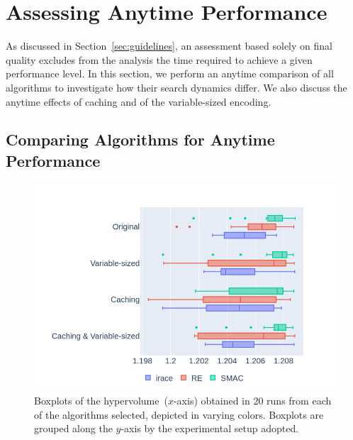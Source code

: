 \section{Assessing Anytime Performance}
\label{sec:anytime}


As discussed in Section~\ref{sec:guidelines}, an assessment based solely on final quality excludes from the analysis the time required to achieve a given performance level. In this section, we perform an anytime comparison of all algorithms to investigate how their search dynamics differ. We also discuss the anytime effects of caching and of the variable-sized encoding. 


\subsection{Comparing Algorithms for Anytime Performance}
\begin{figure}[!t]
\centering
\includegraphics[width=0.9\linewidth, clip=true, trim=40px 20px 0 50px]{imgs/boxplots.png}
\caption{Boxplots of the hypervolume~($x$-axis) obtained in 20 runs from each of the algorithms selected, depicted in varying colors. Boxplots are grouped along the $y$-axis by the experimental setup adopted.}
\label{fig:boxplots}
\end{figure}

